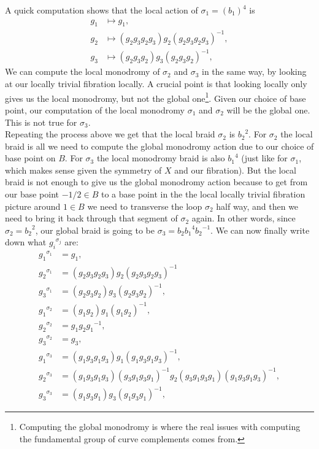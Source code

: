 \documentclass[oneside,reqno]{amsart}
\theoremstyle{definition}
\theoremstyle{definition}
\theoremstyle{definition}
\theoremstyle{definition}
\begin{document}
A quick computation shows that the local action of $\sigma_1 = (b_1)^4$ is 
\begin{align*}
    g_1 &\mapsto g_1, \\
    g_2 &\mapsto (g_2 g_3 g_2 g_3) g_2 (g_2 g_3 g_2 g_3)^{-1}, \\
    g_3 &\mapsto (g_2 g_3 g_2) g_3 (g_2 g_3 g_2)^{-1}, 
\end{align*}
We can compute the local monodromy of $\sigma_2$ and $\sigma_3$ in the same way, by looking at our locally trivial fibration locally. A crucial point is that looking locally only gives us the local monodromy, but not the global one\footnote{Computing the global monodromy is where the real issues with computing the fundamental group of curve complements comes from.}. Given our choice of base point, our computation of the local monodromy $\sigma_1$ and $\sigma_2$ will be the global one. This is not true for $\sigma_3$. \\
\newline
Repeating the process above we get that the local braid $\sigma_2$ is ${b_2}^2$. For $\sigma_2$ the local braid is all we need to compute the global monodromy action due to our choice of base point on $B$. For $\sigma_3$ the local monodromy braid is also ${b_1}^4$ (just like for $\sigma_1$, which makes sense given the symmetry of $X$ and our fibration). But the local braid is not enough to give us the global monodromy action because to get from our base point $-1/2 \in B$ to a base point in the the local locally trivial fibration picture around $1 \in B$ we need to transverse the loop $\sigma_2$ half way, and then we need to bring it back through that segment of $\sigma_2$ again. In other words, since $\sigma_2 = {b_2}^2$, our global braid is going to be $\sigma_3 = b_2 {b_1}^4 {b_2}^{-1}$. We can now finally write down what ${g_i}^{\sigma_j}$ are:
\begin{align*}
    {g_1}^{\sigma_1} &= g_1, \\
    {g_2}^{\sigma_1} &= (g_2 g_3 g_2 g_3) g_2 (g_2 g_3 g_2 g_3)^{-1} \\
    {g_3}^{\sigma_1} &= (g_2 g_3 g_2) g_3 (g_2 g_3 g_2)^{-1}, \\ 
    {g_1}^{\sigma_2} &= (g_1g_2) g_1 (g_1 g_2)^{-1},\\
    {g_2}^{\sigma_2} &= g_1 g_2 {g_1}^{-1},\\
    {g_3}^{\sigma_2} &= g_3, \\
    {g_1}^{\sigma_3} &= (g_1 g_3 g_1 g_3) g_1 (g_1 g_3 g_1 g_3)^{-1}, \\
    {g_2}^{\sigma_3} &= (g_1 g_3 g_1 g_3)(g_3 g_1 g_3 g_1)^{-1} g_2 (g_3 g_1 g_3 g_1)(g_1 g_3 g_1 g_3)^{-1}, \\
    {g_3}^{\sigma_3} &= (g_1 g_3 g_1)g_3 (g_1 g_3 g_1)^{-1}, 
\end{align*}
\end{document}
